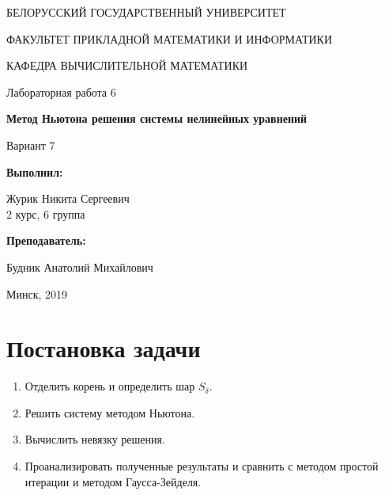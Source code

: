\documentclass[14pt, a4paper]{article}
\begin{document}
\begin{titlepage}
\begin{center}
\large{БЕЛОРУССКИЙ ГОСУДАРСТВЕННЫЙ УНИВЕРСИТЕТ 

ФАКУЛЬТЕТ ПРИКЛАДНОЙ МАТЕМАТИКИ И ИНФОРМАТИКИ

КАФЕДРА ВЫЧИСЛИТЕЛЬНОЙ МАТЕМАТИКИ}
\end{center}
\vspace*{\fill}
\begin{center}
Лабораторная работа 6

\large{\textbf{Метод Ньютона решения системы нелинейных уравнений}}

Вариант 7
\end{center}
\begin{flushright}
\textbf{Выполнил:}

Журик Никита Сергеевич \\ 2 курс, 6 группа

\textbf{Преподаватель:}

Будник Анатолий Михайлович
\end{flushright}
\vspace*{\fill}
\begin{center}
Минск, 2019
\end{center}
\end{titlepage}

\tableofcontents
\newpage

\newpage
{}

  \section{Постановка задачи}
    \begin{enumerate}
      \item
      Отделить корень и определить шар $S_{\delta}$.
      \item
      Решить систему методом Ньютона.
      \item
      Вычислить невязку решения.
      \item
      Проанализировать полученные результаты и сравнить с методом простой итерации и методом Гаусса-Зейделя.
    \end{enumerate}
\end{document}
